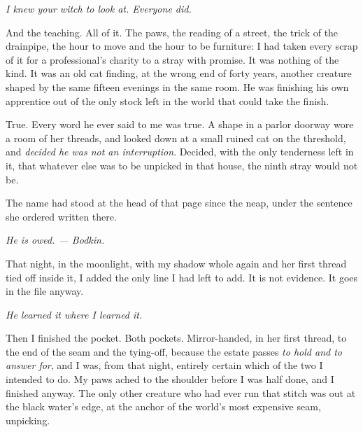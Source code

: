 \emph{I knew your witch to look at. Everyone did.}

And the teaching. All of it. The paws, the reading of a street, the trick of the drainpipe, the hour to move and the hour to be furniture: I had taken every scrap of it for a professional's charity to a stray with promise. It was nothing of the kind. It was an old cat finding, at the wrong end of forty years, another creature shaped by the same fifteen evenings in the same room. He was finishing his own apprentice out of the only stock left in the world that could take the finish.

True. Every word he ever said to me was true. A shape in a parlor doorway wore a room of her threads, and looked down at a small ruined cat on the threshold, and \emph{decided he was not an interruption}. Decided, with the only tenderness left in it, that whatever else was to be unpicked in that house, the ninth stray would not be.

The name had stood at the head of that page since the neap, under the sentence she ordered written there.

\emph{He is owed. --- Bodkin.}

That night, in the moonlight, with my shadow whole again and her first thread tied off inside it, I added the only line I had left to add. It is not evidence. It goes in the file anyway.

\emph{He learned it where I learned it.}

Then I finished the pocket. Both pockets. Mirror-handed, in her first thread, to the end of the seam and the tying-off, because the estate passes \emph{to hold and to answer for}, and I was, from that night, entirely certain which of the two I intended to do. My paws ached to the shoulder before I was half done, and I finished anyway. The only other creature who had ever run that stitch was out at the black water's edge, at the anchor of the world's most expensive seam, unpicking.
